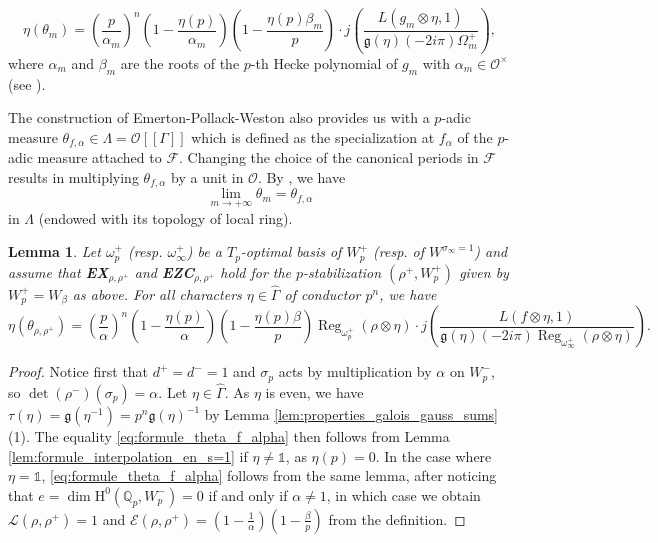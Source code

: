 \documentclass[12pt]{amsart}
\newcommand\Qp{{\mathbb{Q}_p}}
\newcommand\cE{\mathcal{E}}
\newcommand\cF{\mathcal{F}}
\newcommand\cL{\mathcal{L}}
\newcommand\cO{\mathcal{O}}
\newcommand\g{\mathfrak{g}}
\DeclareMathOperator{\Reg}{Reg}
\newcommand{\HH}{\mathrm{H}}
\theoremstyle{defstyle}
\theoremstyle{thmstyle}
\newtheorem{lemme}[subsubsection]{Lemma}
\begin{document}
\begin{equation}\label{eq:formule_theta_m}
\eta(\theta_m)=\left(\frac{p}{\alpha_m}\right)^{n} \left(1-\frac{\eta(p)}{\alpha_m}\right)\left(1-\frac{\eta(p)\beta_m}{p}\right)\cdot j\left(\frac{L(g_m\otimes \eta,1)}{\g(\eta)(-2i\pi)\Omega_m^+}\right),
\end{equation}
where $\alpha_m$ and $\beta_m$ are the roots of the $p$-th Hecke polynomial of $g_m$ with $\alpha_m\in\cO^\times$ (see \cite[Prop. 4.4.1]{maks}).

The construction of Emerton-Pollack-Weston also provides us with a $p$-adic measure $\theta_{f,\alpha}\in\Lambda=\cO[[\Gamma]]$ which is defined as the specialization at $f_\alpha$ of the $p$-adic measure attached to $\cF$. Changing the choice of the canonical periods in $\cF$ results in multiplying $\theta_{f,\alpha}$ by a unit in $\cO$. By \cite[Lemme 4.8.1]{maks}, we have 
\begin{equation}\label{eq:lim_theta_m}
	\lim_{m\to +\infty}\theta_m=\theta_{f,\alpha}
\end{equation}
in $\Lambda$ (endowed with its topology of local ring). 

\begin{lemme}
	Let $\omega_p^+$ (resp. $\omega_{\infty}^+$) be a $T_p$-optimal basis of $W_p^+$ (resp. of $W^{\sigma_\infty=1}$) and assume that \textbf{EX}\(_{\rho,\rho^+}\) and \textbf{EZC}\(_{\rho,\rho^+}\) hold for the $p$-stabilization $(\rho^+,W_p^+)$ given by $W_p^+=W_\beta$ as above. For all characters $\eta \in\widehat{\Gamma}$ of conductor $p^n$, we have
	\begin{equation}\label{eq:formule_theta_f_alpha}
		\eta(\theta_{\rho,\rho^+})=\left(\frac{p}{\alpha}\right)^{n} \left(1-\frac{\eta(p)}{\alpha}\right)\left(1-\frac{\eta(p)\beta}{p}\right) \Reg_{\omega_p^+}(\rho\otimes\eta)\cdot j\left(\frac{L(f\otimes \eta,1)}{\g(\eta)(-2i\pi)\Reg_{\omega_\infty^+}(\rho\otimes\eta)}\right).
	\end{equation}
\end{lemme}
\begin{proof}
	Notice first that $d^+=d^-=1$ and $\sigma_p$ acts by multiplication by $\alpha$ on $W_p^-$, so $\det(\rho^-)(\sigma_p)=\alpha$. Let $\eta\in\widehat{\Gamma}$. As $\eta$ is even, we have $\tau(\eta)=\g(\eta^{-1})=p^n\g(\eta)^{-1}$ by Lemma \ref{lem:properties_galois_gauss_sums} (1). The equality \eqref{eq:formule_theta_f_alpha} then follows from Lemma \ref{lem:formule_interpolation_en_s=1} if $\eta\neq \mathds{1}$, as $\eta(p)=0$. In the case where $\eta=\mathds{1}$, \eqref{eq:formule_theta_f_alpha} follows from the same lemma, after noticing that $e=\dim \HH^0(\Qp,W_p^-)=0$ if and only if $\alpha\neq 1$, in which case we obtain $\cL(\rho,\rho^+)=1$ and $\cE(\rho,\rho^+)=\left(1-\frac{1}{\alpha}\right)\left(1-\frac{\beta}{p}\right)$ from the definition.
\end{proof}
\end{document}
